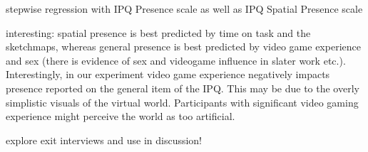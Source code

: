stepwise regression with IPQ Presence scale as well as IPQ Spatial Presence scale

interesting:
spatial presence is best predicted by time on task and the sketchmaps, whereas general presence is best predicted by video game experience and sex (there is evidence of sex and videogame influence in slater work etc.). Interestingly, in our experiment video game experience negatively impacts presence reported on the general item of the IPQ. This may be due to the overly simplistic visuals of the virtual world. Participants with significant video gaming experience might perceive the world as too artificial.

explore exit interviews and use in discussion!